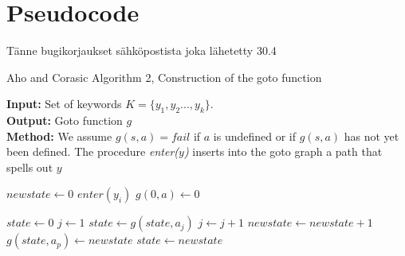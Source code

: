 \documentclass[english,twoside,censored,csm,algorithms-track-2020]{HYthesisML}
\theoremstyle{plain}
\theoremstyle{definition}
\begin{document}
  

  

  \section{Pseudocode}


  
  Tänne bugikorjaukset sähköpostista joka lähetetty 30.4
  \begin{algorithm}
    
    \caption{Aho and Corasic Algorithm 2, Construction of the goto function} \label{ac-goto}
    \hspace*{\algorithmicindent} \textbf{Input:} Set of keywords $K = \{y_1,y_2...,y_k\}$.\\
    \hspace*{\algorithmicindent} \textbf{Output:} Goto function $g$\\
    \hspace*{\algorithmicindent} \textbf{Method:} We assume $g(s,a) = fail$ if $a$ is undefined or if $g(s,a)$ has not yet been defined. The procedure \textit{enter($y$)} inserts into the goto graph a path that spells out $y$
    
      \begin{algorithmic}[1]
          \State $newstate\gets 0$
            \State $enter(y_i)$
          \EndFor
            \State $g(0,a)\gets 0$
          \EndFor
        \EndFunction

          \State $state\gets 0$
          \State $j\gets 1$
            \State $state\gets g(state,a_j)$
            \State $j\gets j+1$
          \EndWhile
            \State $newstate\gets newstate+1$
            \State $g(state,a_p)\gets newstate$
            \State $state\gets newstate$
          \EndFor
        \EndFunction
      \end{algorithmic}
  \end{algorithm}
\end{document}
